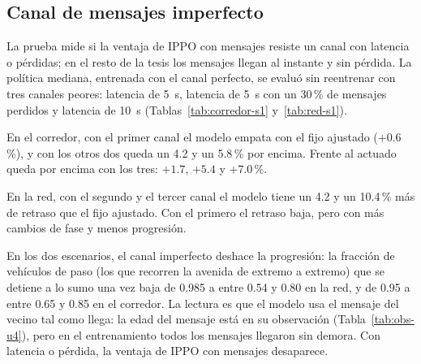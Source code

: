 \subsection*{Canal de mensajes imperfecto}

La prueba mide si la ventaja de IPPO con mensajes resiste un canal con
latencia o pérdidas; en el resto de la tesis los mensajes llegan al
instante y sin pérdida. La política mediana, entrenada con el canal
perfecto, se evaluó sin reentrenar con
tres canales peores: latencia de 5~s, latencia de 5~s con un 30\,\% de
mensajes perdidos y latencia de 10~s (Tablas~\ref{tab:corredor-s1}
y~\ref{tab:red-s1}).

En el corredor, con el primer canal el modelo empata con el fijo
ajustado ($+0.6$\,\%), y con los otros dos queda un 4.2 y un 5.8\,\%
por encima. Frente al actuado queda por encima con los tres: $+1.7$,
$+5.4$ y $+7.0$\,\%.



En la red, con el segundo y el tercer canal el modelo tiene un 4.2 y un
10.4\,\% más de retraso que el fijo ajustado. Con el primero el retraso
baja, pero con más cambios de fase y menos progresión.



En los dos escenarios, el canal imperfecto deshace la progresión: la
fracción de vehículos de paso (los que recorren la avenida de extremo a
extremo) que se detiene a lo sumo una vez baja de 0.985 a entre 0.54 y
0.80 en la red, y de 0.95 a entre 0.65 y 0.85 en el corredor. La
lectura es que el modelo usa el mensaje del vecino tal como llega: la
edad del mensaje está en su observación (Tabla~\ref{tab:obs-u4}), pero
en el entrenamiento todos los mensajes llegaron sin demora. Con latencia
o pérdida, la ventaja de IPPO con mensajes desaparece.

